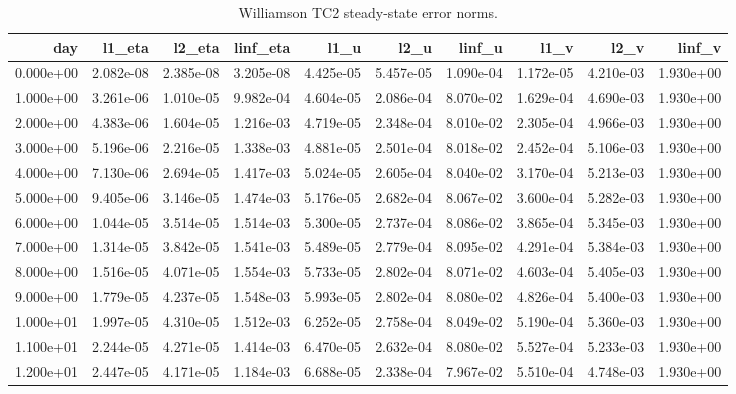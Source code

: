 \begin{table}[htbp]
\centering
{}
\begin{tabular}{rrrrrrrrrr}
\toprule
day & l1\_eta & l2\_eta & linf\_eta & l1\_u & l2\_u & linf\_u & l1\_v & l2\_v & linf\_v \\
\midrule
0.000e+00 & 2.082e-08 & 2.385e-08 & 3.205e-08 & 4.425e-05 & 5.457e-05 & 1.090e-04 & 1.172e-05 & 4.210e-03 & 1.930e+00 \\
1.000e+00 & 3.261e-06 & 1.010e-05 & 9.982e-04 & 4.604e-05 & 2.086e-04 & 8.070e-02 & 1.629e-04 & 4.690e-03 & 1.930e+00 \\
2.000e+00 & 4.383e-06 & 1.604e-05 & 1.216e-03 & 4.719e-05 & 2.348e-04 & 8.010e-02 & 2.305e-04 & 4.966e-03 & 1.930e+00 \\
3.000e+00 & 5.196e-06 & 2.216e-05 & 1.338e-03 & 4.881e-05 & 2.501e-04 & 8.018e-02 & 2.452e-04 & 5.106e-03 & 1.930e+00 \\
4.000e+00 & 7.130e-06 & 2.694e-05 & 1.417e-03 & 5.024e-05 & 2.605e-04 & 8.040e-02 & 3.170e-04 & 5.213e-03 & 1.930e+00 \\
5.000e+00 & 9.405e-06 & 3.146e-05 & 1.474e-03 & 5.176e-05 & 2.682e-04 & 8.067e-02 & 3.600e-04 & 5.282e-03 & 1.930e+00 \\
6.000e+00 & 1.044e-05 & 3.514e-05 & 1.514e-03 & 5.300e-05 & 2.737e-04 & 8.086e-02 & 3.865e-04 & 5.345e-03 & 1.930e+00 \\
7.000e+00 & 1.314e-05 & 3.842e-05 & 1.541e-03 & 5.489e-05 & 2.779e-04 & 8.095e-02 & 4.291e-04 & 5.384e-03 & 1.930e+00 \\
8.000e+00 & 1.516e-05 & 4.071e-05 & 1.554e-03 & 5.733e-05 & 2.802e-04 & 8.071e-02 & 4.603e-04 & 5.405e-03 & 1.930e+00 \\
9.000e+00 & 1.779e-05 & 4.237e-05 & 1.548e-03 & 5.993e-05 & 2.802e-04 & 8.080e-02 & 4.826e-04 & 5.400e-03 & 1.930e+00 \\
1.000e+01 & 1.997e-05 & 4.310e-05 & 1.512e-03 & 6.252e-05 & 2.758e-04 & 8.049e-02 & 5.190e-04 & 5.360e-03 & 1.930e+00 \\
1.100e+01 & 2.244e-05 & 4.271e-05 & 1.414e-03 & 6.470e-05 & 2.632e-04 & 8.080e-02 & 5.527e-04 & 5.233e-03 & 1.930e+00 \\
1.200e+01 & 2.447e-05 & 4.171e-05 & 1.184e-03 & 6.688e-05 & 2.338e-04 & 7.967e-02 & 5.510e-04 & 4.748e-03 & 1.930e+00 \\
\bottomrule
\end{tabular}
\caption{Williamson TC2 steady-state error norms.}
\end{table}

